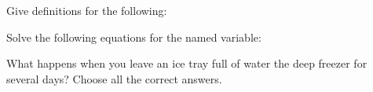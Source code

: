 \documentclass[11pt,addpoints]{exam}   	%
\begin{document}
\begin{questions}
\question
Give definitions for the following:

\question
Solve the following equations for the named variable:

\question[5]
What happens when you leave an ice tray full of water the deep freezer for several days?
Choose all the correct answers.


\end{questions}
\end{document}
